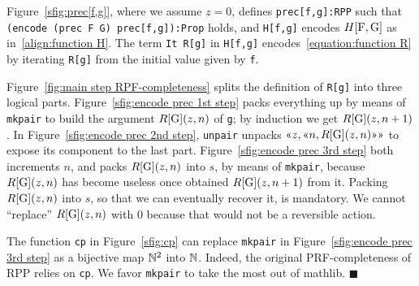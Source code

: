 \documentclass[runningheads]{llncs}
\newcommand*{\qeda}{\hfill\ensuremath{\blacksquare}}%
\newcommand{\RPP}{\textsf{RPP}\xspace}
\newcommand{\PRF}{\textsf{PRF}\xspace}
\newcommand{\MATHLIB}{\textsf{mathlib}\xspace}
\begin{document}
Figure~\ref{sfig:prec[f,g]}, where we assume $ z = 0 $, defines \lstinline|prec[f,g]:RPP| such that \lstinline|(encode (prec F G) prec[f,g]):Prop| holds, and \lstinline|H[f,g]| encodes
$ H[\mbox{\lstinline|F|},\mbox{\lstinline|G|}]$ as in~\eqref{align:function H}.
The term \lstinline|It R[g]| in \lstinline|H[f,g]| encodes~\eqref{equation:function R} by iterating \lstinline|R[g]| from the initial value given by \lstinline|f|.


Figure~\ref{fig:main step RPF-completeness} splits the definition of \lstinline|R[g]| into three logical parts.
Figure~\ref{sfig:encode prec 1st step} packs everything up by means of \lstinline|mkpair| to build the argument $ R[\mbox{\lstinline|G|}](z,n) $ of \lstinline|g|; by induction we get
$ R[\mbox{\lstinline|G|}](z,n+1) $.
In Figure~\ref{sfig:encode prec 2nd step}, \lstinline|unpair| unpacks $ \gl z, \gl n, R[\mbox{\lstinline|G|}](z,n) \gr \gr $ to expose its component to the last part.
Figure~\ref{sfig:encode prec 3rd step} both increments $ n $, and packs $ R[\mbox{\lstinline|G|}](z,n) $ into $ s $, by means of \lstinline|mkpair|, because $ R[\mbox{\lstinline|G|}](z,n) $ has become useless once obtained $ R[\mbox{\lstinline|G|}](z,n+1) $ from it. Packing $ R[\mbox{\lstinline|G|}](z,n) $ into $ s $, so that we can eventually recover it, is mandatory. We cannot ``replace'' $ R[\mbox{\lstinline|G|}](z,n) $ with $ 0 $ because that would not be a reversible action.

\begin{remark}
The function \lstinline|cp| in Figure~\ref{sfig:cp} can replace \lstinline|mkpair| in Figure~\ref{sfig:encode prec 3rd step} as a bijective map $ \mathbb{N}^2$ into $\mathbb{N}$. Indeed, the original \PRF-completeness of \RPP relies on \lstinline|cp|. We favor \lstinline|mkpair| to take the most out of \MATHLIB. \qeda
\end{remark}
\end{document}
